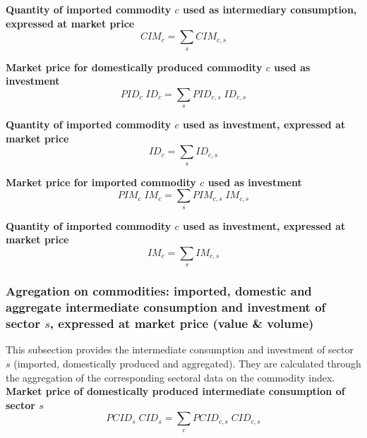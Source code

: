 \documentclass[12pt]{article}
\numberwithin{equation}{section}
\begin{document}
\noindent\textbf{Quantity of imported commodity $c$ used as intermediary consumption, expressed at market price} \\
\begin{dmath}
CIM_{c} = \sum_{s} CIM_{c, s}
\end{dmath}

\noindent\textbf{Market price for domestically produced commodity $c$ used as investment} \\
\begin{dmath}
PID_{c} \; ID_{c} = \sum_{s} PID_{c, s} \; ID_{c, s}
\end{dmath}

\noindent\textbf{Quantity of imported commodity $c$ used as investment, expressed at market price} \\
\begin{dmath}
ID_{c} = \sum_{s} ID_{c, s}
\end{dmath}

\noindent\textbf{Market price for imported commodity $c$ used as investment} \\
\begin{dmath}
PIM_{c} \; IM_{c} = \sum_{s} PIM_{c, s} \; IM_{c, s}
\end{dmath}

\noindent\textbf{Quantity of imported commodity $c$ used as investment, expressed at market price} \\
\begin{dmath}
IM_{c} = \sum_{s} IM_{c, s}
\end{dmath}




\subsubsection{Agregation on commodities: imported, domestic and aggregate intermediate consumption and investment of sector $s$, expressed at market price (value \& volume)}


This subsection provides the intermediate consumption and investment of sector $s$ (imported, domestically produced and aggregated). They are calculated through the aggregation of the corresponding sectoral data on the commodity index. \\

\noindent\textbf{Market price of domestically produced intermediate consumption of sector $s$} \\
\begin{dmath}
PCID_{s} \; CID_{s} = \sum_{c} PCID_{c, s} \; CID_{c, s}
\end{dmath}
\end{document}
